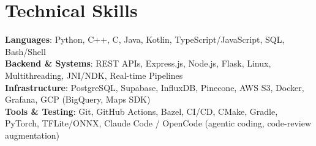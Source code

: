\documentclass[letterpaper,11pt]{article}
\begin{document}
\section{Technical Skills}
 \resumeSubHeadingListStart
    \small{
      \item{
        \textbf{Languages}{: Python, C++, C, Java, Kotlin, TypeScript/JavaScript, SQL, Bash/Shell} \\
        \textbf{Backend \& Systems}{: REST APIs, Express.js, Node.js, Flask, Linux, Multithreading, JNI/NDK, Real-time Pipelines} \\
        \textbf{Infrastructure}{: PostgreSQL, Supabase, InfluxDB, Pinecone, AWS S3, Docker, Grafana, GCP (BigQuery, Maps SDK)} \\
        \textbf{Tools \& Testing}{: Git, GitHub Actions, Bazel, CI/CD, CMake, Gradle, PyTorch, TFLite/ONNX, Claude Code / OpenCode (agentic coding, code-review augmentation)}    
      }
    }
 \resumeSubHeadingListEnd

\end{document}
